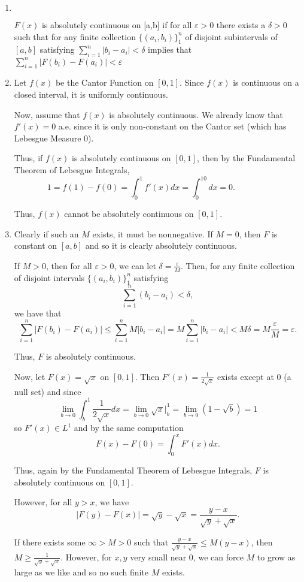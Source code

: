 \documentclass[12pt]{Homework}
\renewenvironment{framed}[1][\hsize]
   {\MakeFramed{\hsize#1\advance\hsize-\width \FrameRestore}}%
   {\endMakeFramed}
\begin{document}
\begin{solution}$\,$
\begin{enumerate}[label=(\alph*)]
    \item $\,$
    
    \begin{framed}[.75\textwidth]
    $F(x)$ is absolutely continuous on [a,b] if for all $\varepsilon>0$ there exists a $\delta>0$ such that for any finite collection $\{(a_i,b_i)\}_1^n$ of disjoint subintervals of $[a,b]$ satisfying $\displaystyle\sum_{i=1}^n|b_i-a_i|<\delta$ implies that $\displaystyle\sum_{i=1}^n|F(b_i)-F(a_i)|<\varepsilon$
    \end{framed}
    \item Let $f(x)$ be the Cantor Function on $[0,1]$. Since $f(x)$ is continuous on a closed interval, it is uniformly continuous.
    
    Now, assume that $f(x)$ is absolutely continuous. We already know that $f'(x)=0$ a.e. since it is only non-constant on the Cantor set (which has Lebesgue Measure $0$). 
    
    Thus, if $f(x)$ is absolutely continuous on $[0,1]$, then by the Fundamental Theorem of Lebesgue Integrals, $$1=f(1)-f(0)=\int_0^1f'(x)dx=\int_0^10dx=0.\qquad\qquad$$
    
    Thus, $f(x)$ cannot be absolutely continuous on $[0,1]$.
    \item Clearly if such an $M$ exists, it must be nonnegative. If $M=0$, then $F$ is constant on $[a,b]$ and so it is clearly absolutely continuous. 
    
    If $M>0$, then for all $\varepsilon>0$, we can let $\delta=\frac{\varepsilon}{M}$. Then, for any finite collection of disjoint intervals $\{(a_i,b_i)\}_1^n$ satisfying $$\sum_{i=1}^n(b_i-a_i)<\delta,$$ we have that $$\sum_{i=1}^n|F(b_i)-F(a_i)|\le\sum_{i=1}^nM|b_i-a_i|=M\sum_{i=1}^n|b_i-a_i|<M\delta=M\frac{\varepsilon}{M}=\varepsilon.$$
    
    Thus, $F$ is absolutely continuous.
    
    Now, let $F(x)=\sqrt{x}$ on $[0,1]$. Then $F'(x)=\frac{1}{2\sqrt{x}}$ exists except at $0$ (a null set) and since $$\lim_{b\to0}\int_b^1\frac{1}{2\sqrt{x}}dx=\lim_{b\to0}\sqrt{x}\bigg|_b^1=\lim_{b\to0}(1-\sqrt{b})=1$$ so $F'(x)\in L^1$ and by the same computation $$F(x)-F(0)=\int_0^xF'(x)dx.$$
    
    Thus, again by the Fundamental Theorem of Lebesgue Integrals, $F$ is absolutely continuous on $[0,1]$.
    
    However, for all $y>x$, we have $$|F(y)-F(x)|=\sqrt{y}-\sqrt{x}=\frac{y-x}{\sqrt{y}+\sqrt{x}}.$$
    
    If there exists some $\infty>M>0$ such that $\frac{y-x}{\sqrt{y}+\sqrt{x}}\le M(y-x)$, then $M\ge\frac{1}{\sqrt{y}+\sqrt{x}}.$ However, for $x,y$ very small near $0$, we can force $M$ to grow as large as we like and so no such finite $M$ exists.
\end{enumerate}
\end{solution}
\vspace{0.5cm}
\end{document}

